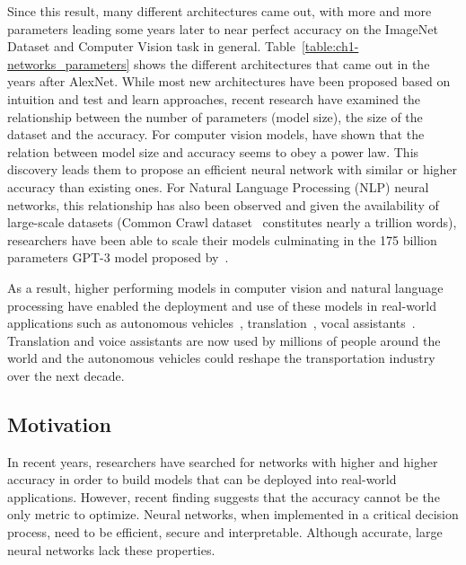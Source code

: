 Since this result, many different architectures came out, with more and more parameters leading some years later to near perfect accuracy on the ImageNet Dataset and Computer Vision task in general.
Table~\ref{table:ch1-networks_parameters} shows the different architectures that came out in the years after AlexNet.
While most new architectures have been proposed based on intuition and test and learn approaches, recent research \cite{tan2019efficientnet,rosenfeld2020a} have examined the relationship between the number of parameters (model size), the size of the dataset and the accuracy.
For computer vision models, \citet{tan2019efficientnet} have shown that the relation between model size and accuracy seems to obey a power law. 
This discovery leads them to propose an efficient neural network with similar or higher accuracy than existing ones.  
For Natural Language Processing (NLP) neural networks, this relationship has also been observed and given the availability of large-scale datasets (Common Crawl dataset~\cite{raffel2019exploring} constitutes nearly a trillion words), researchers have been able to scale their models culminating in the 175 billion parameters GPT-3 model proposed by~\citet{brown2020language}. 

As a result, higher performing models in computer vision and natural language processing have enabled the deployment and use of these models in real-world applications such as autonomous vehicles~\cite{fagnant2015preparing}, translation~\cite{wu2016google}, vocal assistants~\cite{li2017acoustic}.
Translation and voice assistants are now used by millions of people around the world and the autonomous vehicles could reshape the transportation industry over the next decade.


\subsection{Motivation}
\label{subsection:ch1-motivation}


In recent years, researchers have searched for networks with higher and higher accuracy in order to build models that can be deployed into real-world applications. 
However, recent finding suggests that the accuracy cannot be the only metric to optimize. 
Neural networks, when implemented in a critical decision process, need to be efficient, secure and interpretable.
Although accurate, large neural networks lack these properties.


